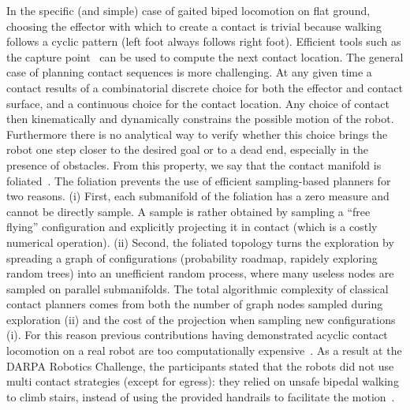 In the specific (and simple) case of gaited biped locomotion on flat ground, choosing the effector with which to create a contact is trivial because walking follows a cyclic pattern (left foot always follows right foot).
Efficient tools such as the capture point~\citep{Pratt2006} can be used to compute the next contact location. 
%
The general case of planning contact sequences is more challenging.
At any given time a contact results of a combinatorial discrete choice for both the effector and contact surface, and a continuous choice for the contact location.
Any choice of contact then kinematically and dynamically constrains the possible motion of the robot.
Furthermore there is no analytical way to verify whether this choice brings the robot one step closer to the desired goal or to a dead end, especially in the presence of obstacles.
From this property, we say that the contact manifold is foliated~\citep{simeon-manipulation-04}. 
The foliation prevents the use of efficient sampling-based planners for two reasons.
(i) First, each submanifold of the foliation has a zero measure and cannot be directly sample.
A sample is rather obtained by sampling a ``free flying'' configuration and explicitly projecting it in contact (which is a costly numerical operation).
(ii) Second, the foliated topology turns the exploration by spreading a graph of configurations (probability roadmap, rapidely exploring random trees) into an unefficient random process, where many useless nodes are sampled on parallel submanifolds.
The total algorithmic complexity of classical contact planners comes from both the number of graph nodes sampled during exploration (ii) and the cost of the projection when sampling new configurations (i).
%
For this reason previous contributions having demonstrated acyclic contact locomotion on a real robot are too computationally expensive~\citep{Bretl:2006:MPM:1124573.1124585}. As a result at the DARPA Robotics Challenge, the participants stated that the robots did not use multi contact strategies (except for egress): they relied on unsafe bipedal walking to climb stairs, instead of using the provided handrails to facilitate the motion~\citep{atkensondarpa}. 



